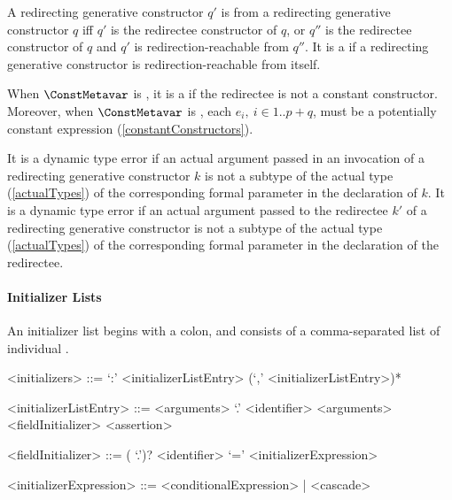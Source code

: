\documentclass[makeidx]{article}
\begin{document}
\LMHash{}%
A redirecting generative constructor $q'$ is 
from a redirecting generative constructor $q$ if{}f
$q'$ is the redirectee constructor of $q$,
or $q''$ is the redirectee constructor of $q$
and $q'$ is redirection-reachable from $q''$.
It is a  if a redirecting generative constructor
is redirection-reachable from itself.

\LMHash{}%
When $\ConstMetavar$ is \CONST,
it is a
 if the redirectee is not a constant constructor.
Moreover, when $\ConstMetavar$ is \CONST, each
$e_i,\ i \in 1 .. p+q$,
must be a potentially constant expression (\ref{constantConstructors}).

\LMHash{}%
It is a dynamic type error if an actual argument passed
in an invocation of a redirecting generative constructor $k$
is not a subtype of the actual type (\ref{actualTypes})
of the corresponding formal parameter in the declaration of $k$.
It is a dynamic type error if an actual argument passed
to the redirectee $k'$ of a redirecting generative constructor
is not a subtype of the actual type
(\ref{actualTypes})
of the corresponding formal parameter in the declaration of the redirectee.


\paragraph{Initializer Lists}

\LMHash{}%
An initializer list begins with a colon,
and consists of a comma-separated list of individual .


\begin{grammar}
<initializers> ::= `:' <initializerListEntry> (`,' <initializerListEntry>)*

<initializerListEntry> ::= \SUPER{} <arguments>
  \alt \SUPER{} `.' <identifier> <arguments>
  \alt <fieldInitializer>
  \alt <assertion>

<fieldInitializer> ::= \gnewline{}
  (\THIS{} `.')? <identifier> `=' <initializerExpression>

<initializerExpression> ::= <conditionalExpression> | <cascade>
\end{grammar}
\end{document}
